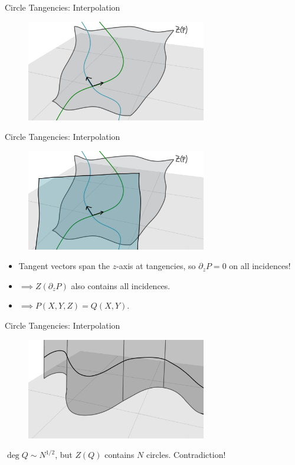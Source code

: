 \documentclass{beamer}
\newcommand{\nfr}[1]{\begin{frame} #1
\end{frame}}
\begin{document}
\nfr{{Circle Tangencies: Interpolation}
\begin{figure}[h]
    \centering
    \includegraphics[width=0.7\textwidth]{images/lots_of_dots_h.png}
\end{figure}

}
\nfr{{Circle Tangencies: Interpolation}
\begin{figure}[h]
    \centering
    \includegraphics[width=0.7\textwidth]{images/lots_of_dots_i.png}
\end{figure}
\begin{itemize}
    \item Tangent vectors span the $z$-axis at tangencies, so $\partial_z P = 0$ on all incidences! 
    \item $\implies Z(\partial_z P)$ also contains all incidences. 
    \item $\implies P(X,Y,Z) = Q(X,Y)$.
\end{itemize}
}
\nfr{{Circle Tangencies: Interpolation}
\begin{figure}[h]
    \centering
    \includegraphics[width=0.7\textwidth]{images/lots_of_dots_j.png}
\end{figure}
$\deg Q \sim N^{1/2}$, but $Z(Q)$ contains $N$ circles.
Contradiction!
}
\end{document}
